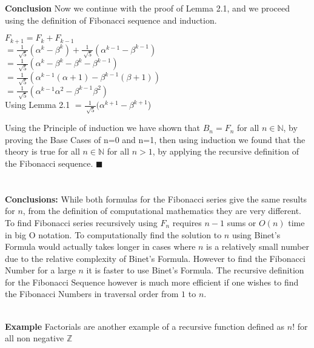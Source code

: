 \documentclass{article}
\begin{document}
{\bf Conclusion} Now we continue with the proof of Lemma 2.1, and we proceed using the definition of Fibonacci sequence and induction.
\begin{center}
	$F_{k+1}=F_{k}+F_{k-1}$
	\\
	$
	=\frac{1}{\sqrt[]{5}}(\alpha^k-\beta^k)+\frac{1}{\sqrt[]{5}}(\alpha^{k-1}-\beta^{k-1})
$
\\
$
=
\frac{1}{\sqrt[]{5}}(\alpha^k-\beta^k-\beta^k-\beta^{k-1})
$
\\
$=\frac{1}{\sqrt[]{5}}(\alpha^{k-1}(\alpha+1)-\beta^{k-1}(\beta+1))$
\\
$=\frac{1}{\sqrt[]{5}}(\alpha^{k-1}\alpha^{2}-\beta^{k-1}\beta^2)$
\\
Using Lemma 2.1
$=\frac{1}{\sqrt[]{5}}(\alpha^{k+1}-\beta^{k+1}$)
\\
\end{center}
Using the Principle of induction we have shown that $B_n=F_n$ for all $n \in {\mathbb N}$, by proving the Base Cases of n=0 and n=1, then using induction we found that the theory is true for all $n \in {\mathbb N}$ for all $n>1$, by applying the recursive definition of the Fibonacci sequence.   
$\blacksquare$
\\
~\\
~\\
{\bf Conclusions:} While both formulas for the Fibonacci series give the same results for $n$, from the definition of computational mathematics they are very different. To find Fibonacci series recursively using $F_n$ requires $n-1$ sums or $O(n)$ time in big O notation. To computationally find the solution to $n$ using Binet's Formula would actually takes longer in cases where $n$ is a relatively small number due to the relative complexity of Binet's Formula.  However to find the Fibonacci Number for a large $n$ it is faster to use Binet's Formula. The recursive definition for the Fibonacci Sequence however is much more efficient if one wishes to find the Fibonacci Numbers in traversal order from $1$ to $n$.      
\\
\begin{comment}
	ToDo: Factorials, Other math stuff (like Catalan numbers) glanced over, Finally Computer Science implementation,Other applications: in nature Fractals
	also: recursive humor, recursive acronym: discuss recursion in languages?
\end{comment}
\\
{\bf Example} Factorials are another example of a recursive function defined as $n!$ for all non negative $\mathbb{Z}$
\\
\end{document}
